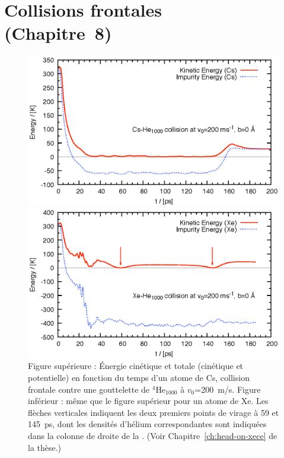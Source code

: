 	\section*{Collisions frontales\\\small(Chapitre~8)}
		\begin{figure}
			\centerline{\includegraphics[width=\linewidth]{fig3-Cs-He}} 
			\centerline{\includegraphics[width=\linewidth]{fig3-Xe-He}}
			\caption{\label{fig3-headon}Figure supérieure : Énergie cinétique et totale (cinétique et potentielle) en fonction du temps d'un atome de Cs, collision frontale contre une gouttelette de $^4$He$_{1000}$ à $v_0$=200~m/s. Figure inférieur : même que le figure supérieur pour un atome de Xe. Les flèches verticales indiquent les deux premiers points de virage à 59 et 145~ps, dont les densités d'hélium correspondantes sont indiquées dans la colonne de droite de la .  (Voir Chapitre~\ref{ch:head-on-xece} de la thèse.)}
		\end{figure}	
